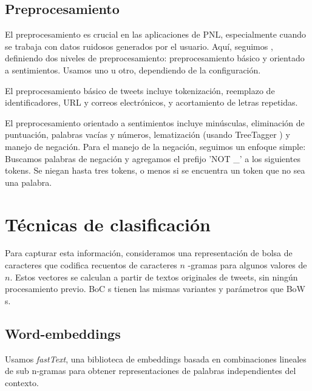 \subsection {Preprocesamiento}


\newcommand{\elmo}[0]{ELMo}
\newcommand{\elmomodel}[0]{\emph{LSTM-\elmo{}}}
\newcommand{\bow}[0]{BoW}
\newcommand{\boc}[0]{BoC}
\newcommand{\elmobowmodel}[0]{\emph{LSTM-\elmo{}+\bow{}}}
\newcommand{\svmmodel}[0]{$\mathrm{SVM}_0$}
\newcommand{\hateval}[0]{HatEval}
\newcommand{\semeval}[0]{SemEval-2019}
\newcommand{\fasttext}[0]{\emph{fastText}}

El preprocesamiento es crucial en las aplicaciones de PNL, especialmente cuando se trabaja con datos ruidosos generados por el usuario. Aquí, seguimos \citet{atalaya_tass2018}, definiendo dos niveles de preprocesamiento: preprocesamiento básico y orientado a sentimientos. Usamos uno u otro, dependiendo de la configuración.

El preprocesamiento básico de tweets incluye tokenización, reemplazo de identificadores, URL y correos electrónicos, y acortamiento de letras repetidas.

El preprocesamiento orientado a sentimientos incluye minúsculas, eliminación de puntuación, palabras vacías y números, lematización (usando TreeTagger \cite{schmid95}) y manejo de negación.
Para el manejo de la negación, seguimos un enfoque simple:
Buscamos palabras de negación y agregamos el prefijo 'NOT \_' a los siguientes tokens. Se niegan hasta tres tokens, o menos si se encuentra un token que no sea una palabra.

\section{Técnicas de clasificación}

Para capturar esta información, consideramos una representación de bolsa de caracteres que codifica recuentos de caracteres $n$ -gramas para algunos valores de $ n $. Estos vectores se calculan a partir de textos originales de tweets, sin ningún procesamiento previo. \boc {} s tienen las mismas variantes y parámetros que \bow {} s.


\subsection {Word-embeddings}

Usamos \fasttext{}, una biblioteca de embeddings basada en combinaciones lineales de sub n-gramas \cite{bojanowski16} para obtener representaciones de palabras independientes del contexto.


